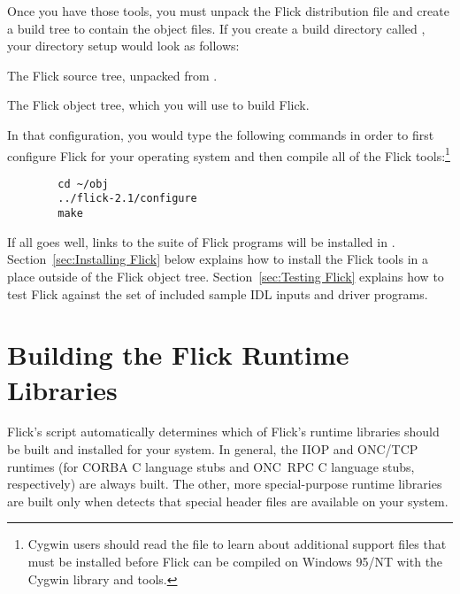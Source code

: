 Once you have those tools, you must unpack the Flick distribution 
file and create a build tree to contain the object files.  If you create a
build directory called , your directory setup would look as
follows:

\begin{filenamelist}
  \item[~/flick-2.1]  The Flick source tree, unpacked from
  .

  \item[~/obj] The Flick object tree, which you will use to build Flick.
\end{filenamelist}

\noindent In that configuration, you would type the following commands in order
to first configure Flick for your operating system and then compile all of the
Flick tools:\footnote{Cygwin users should read the
 file to learn about additional support files
that must be installed before Flick can be compiled on Windows 95/NT with the
Cygwin library and tools.}

\begin{verbatim}
        cd ~/obj
        ../flick-2.1/configure
        make
\end{verbatim}

\noindent If all goes well, links to the suite of Flick programs will be
installed in .  Section~\ref{sec:Installing Flick} below
explains how to install the Flick tools in a place outside of the Flick object
tree.  Section~\ref{sec:Testing Flick} explains how to test Flick against the
set of included sample IDL inputs and driver programs.



\section{Building the Flick Runtime Libraries}
\label{sec:Building the Flick Runtime Libraries}

Flick's  script automatically determines which of Flick's
runtime libraries should be built and installed for your system.  In general,
the IIOP and ONC/TCP runtimes (for CORBA C language stubs and ONC~RPC C
language stubs, respectively) are always built.  The other, more
special-purpose runtime libraries are built only when 
detects that special header files are available on your system.

